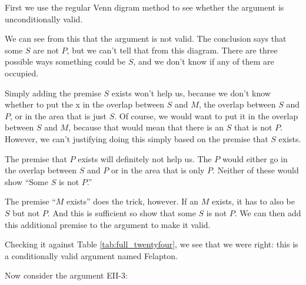 \begin{kormanize}
\end{kormanize}

First we use the regular Venn digram method to see whether the argument is unconditionally valid.






We can see from this that the argument is not valid. The conclusion says that some $S$ are not $P$, but we can't tell that from this diagram. There are three possible ways something could be $S$, and we don't know if any of them are occupied.

Simply adding the premise $S$ exists won't help us, because we don't know whether to put the x in the overlap between $S$ and $M$, the overlap between $S$ and $P$, or in the area that is just $S$. Of course, we would want to put it in the overlap between $S$ and $M$, because that would mean that there is an $S$ that is not $P$. However, we can't justifying doing this simply based on the premise that $S$ exists.

The premise that $P$ exists will definitely not help us. The $P$ would either go in the overlap between $S$ and $P$ or in the area that is only $P$. Neither of these would show ``Some $S$ is not $P$.''

The premise ``$M$ exists'' does the trick, however. If an $M$ exists, it has to also be $S$ but not $P$. And this is sufficient so show that some $S$ is not $P$. We can then add this additional premise to the argument to make it valid.

\begin{kormanize}
\end{kormanize}

Checking it against Table \ref{tab:full_twentyfour}, we see that we were right: this is a conditionally valid argument named Felapton.

Now consider the argument EII-3:

\begin{kormanize}
 \end{kormanize}

